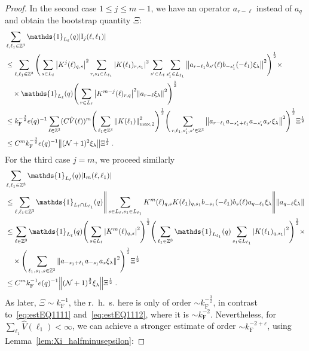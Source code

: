 \documentclass[12pt,a4paper]{article}
\numberwithin{equation}{section}
\newcommand{\1}{\mathbb{I}}
\newcommand{\F}{\mathrm{F}}
\newcommand{\I}{\mathrm{I}}
\newcommand{\kF}{k_\F}
\newcommand{\Zstar}{\mathbb{Z}^3} %
\newcommand{\Z}{\mathbb{Z}}
\newcommand{\NN}{\mathcal{N}}
\newcommand{\half}{\frac{1}{2}}
\theoremstyle{plain}
\theoremstyle{definition}
\theoremstyle{remark}
\theoremstyle{plain}
\theoremstyle{definition}
\theoremstyle{remark}
\begin{document}
\begin{proof}
In the second case $ 1 \le j \le m-1 $, we have an operator $ a_{r-\ell} $ instead of $ a_q $ and obtain the bootstrap quantity $ \Xi $:
\begin{align}
	&\sum_{\ell,\ell_1 \in \Zstar} \mathds{1}_{L_\ell}(q) |\I_j(\ell, \ell_1)| \nonumber\\
	&\leq \sum_{\ell,\ell_1 \in \Zstar} \Bigg( \sum\limits_{s \in L_\ell} \abs{K^j(\ell)_{q,s}}^2
		\sum\limits_{r, s_1 \in L_{\ell_1}} \abs{K(\ell_1)_{r,s_1}}^2
		\sum\limits_{s' \in L_\ell} \sum\limits_{s_1' \in L_{\ell_1}} \norm{a_{r-\ell_1} b_{s'}(\ell) b_{-s_1'}(-\ell_1) \xi_\lambda}^2 \Bigg)^\half \times \nonumber\\
	&\quad \times \mathds{1}_{L_\ell}(q) \Bigg( \sum\limits_{r\in L_{\ell}} \abs{K^{m-j}(\ell)_{r,q}}^2 \norm{a_{r-\ell} \xi_\lambda }^2 \Bigg)^\half\nonumber\\
	&\leq \kF^{-\frac 32} e(q)^{-1}
		\sum_{\ell \in \Zstar} (C \hat{V}(\ell))^m
		\Bigg( \sum_{\ell_1 \in \Zstar} \norm{K(\ell_1)}_{\max,2}^2 \Bigg)^{\half} 
		\Bigg( \sum\limits_{r,\ell_1,s_1',s' \in \Z^3} \norm{a_{r-\ell_1} a_{-s_1'+\ell_1} a_{-s_1'} a_{s'} \xi_\lambda}^2 \Bigg)^\half
		\Xi^\half \nonumber\\
	&\leq C^m \kF^{-\frac 32} e(q)^{-1}
		\norm{(\NN+1)^2 \xi_\lambda} \Xi^\half \;. \label{eq:estEQ1112}
\end{align}
For the third case $ j = m $, we proceed similarly
\begin{align}
	& \sum_{\ell,\ell_1 \in \Zstar} \mathds{1}_{L_\ell}(q) |\I_m(\ell, \ell_1)| \nonumber\\
	&\leq \sum_{\ell,\ell_1 \in \Zstar} \mathds{1}_{L_\ell \cap L_{\ell_1}}(q)
		\Bigg\Vert \sum\limits_{s\in L_{\ell}, s_1 \in L_{\ell_1}} K^m(\ell)_{q,s}K(\ell_1)_{q,s_1} b_{-s_1}(-\ell_1) b_{s}(\ell) a_{q-\ell_1}\xi_\lambda \Bigg\Vert
		\norm{ a_{q-\ell}\xi_\lambda }\nonumber\\
	&\leq \sum_{\ell \in \Zstar} \mathds{1}_{L_\ell}(q) \Bigg(\sum\limits_{s \in L_{\ell}} \abs{K^m(\ell)_{q,s}}^2\Bigg)^\half 
		\Bigg(\sum_{\ell_1 \in \Zstar} \mathds{1}_{L_{\ell_1}}(q) \sum\limits_{s_1 \in L_{\ell_1}} \abs{K(\ell_1)_{q,s_1}}^2\Bigg)^\half \times \nonumber\\
	&\quad \times \Bigg( \sum_{\ell_1, s_1, s \in \Z^3} \norm{ a_{-s_1+\ell_1} a_{-s_1} a_s \xi_\lambda}^2 \Bigg)^{\half} \Xi^\half \nonumber\\
	&\leq C^m \kF^{-1} e(q)^{-1} \norm{ (\NN+1)^{\frac 32} \xi_\lambda}\Xi^\half \;. \label{eq:estEQ1113_Coulomb}
\end{align}
As later, $ \Xi \sim \kF^{-1} $, the r.~h.~s. here is only of order $ \sim \kF^{-\frac 32} $, in contrast to~\eqref{eq:estEQ1111} and~\eqref{eq:estEQ1112}, where it is $ \sim \kF^{-2} $. Nevertheless, for $ \sum_{\ell_1} \hat{V}(\ell_1) < \infty $, we can achieve a stronger estimate of order $ \sim \kF^{-2 + \varepsilon} $, using Lemma~\ref{lem:Xi_halfminusepsilon}:

\end{proof}
\end{document}
